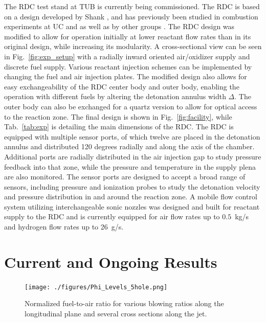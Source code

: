\documentclass[]{aiaa-tc}%
\begin{document}
The RDC test stand at TUB is currently being commissioned. The RDC is based on a design developed by Shank \cite{Shank2012}, and has previously been studied in combustion experiments at UC and as well as by other groups \cite{Naples2013, Paxson2015, Anand2016, St.George2015a, Driscoll2015, Pandiya2016}. The RDC design was modified to allow for operation initially at lower reactant flow rates than in its original design, while increasing its modularity. A cross-sectional view can be seen in Fig.~\ref{fig:exp_setup} with a radially inward oriented air/oxidizer supply and discrete fuel supply. Various reactant injection schemes can be implemented by changing the fuel and air injection plates. The modified design also allows for easy exchangeability of the RDC center body and outer body, enabling the operation with different fuels by altering the detonation annulus width $\Delta$. The outer body can also be exchanged for a quartz version to allow for optical access to the reaction zone.  The final design is shown in Fig.~\ref{fig:facility}, while Tab.~\ref{tab:exp} is detailing the main dimensions of the RDC. The RDC is equipped with multiple sensor ports, of which twelve are placed in the detonation annulus and distributed 120 degrees radially and along the axis of the chamber. Additional ports are radially distributed in the air injection gap to study pressure feedback into that zone, while the pressure and temperature in the supply plena are also monitored. The sensor ports are designed to accept a broad range of sensors, including pressure and ionization probes to study the detonation velocity and pressure distribution in and around the reaction zone. A mobile flow control system utilizing interchangeable sonic nozzles was designed and built for reactant supply to the RDC and is currently equipped for air flow rates up to $0.5$~kg/s and hydrogen flow rates up to 26~g/s.


\section{Current and Ongoing Results}

\begin{figure}[ht]
	\centering
 	\texttt{[image: ./figures/Phi\_Levels\_5hole.png]}
 	\caption{Normalized fuel-to-air ratio for various blowing ratios along the longitudinal plane and several cross sections along the jet.}
 	\label{fig:JIC}
\end{figure}
\end{document}
